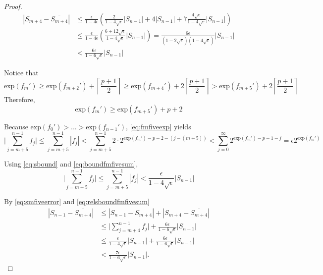\documentclass[12pt]{article}
\providecommand{\exp}{\ensuremath{\text{exp}}}
\theoremstyle{definition}
\numberwithin{equation}{section}
\numberwithin{figure}{section}
\begin{document}
\begin{proof}
      \begin{align}
      \left|S_{m+4} - \overline{S_{m+4}}\right|
          & \leq \frac{\epsilon}{1-4\epsilon}
              \left(
                  \frac{2}{1-4\sqrt{\epsilon}} |S_{n-1}|
                  + 4 |S_{n-1}|
                  + 7 \frac{4\sqrt{\epsilon}}{1-4\sqrt{\epsilon}} |S_{n-1}|
              \right) \nonumber \\
          & \leq \frac{\epsilon}{1-4\epsilon} \left(\frac{6+12\sqrt{\epsilon}}{1-4\sqrt{\epsilon}} |S_{n-1}|\right)
              = \frac{6\epsilon }{(1-2\sqrt{\epsilon})(1-4\sqrt{\epsilon})} |S_{n-1}| \nonumber \\
          & < \frac{6\epsilon}{1-6\sqrt{\epsilon}} |S_{n-1}|
          \label{eq:smfiveerror}
      \end{align}

      Notice that
      \begin{equation*}
        \exp(f_m') \geq \exp(f_{m + 2}') + \left\lceil\frac{p+ 1}{2}\right\rceil \geq \exp(f_{m + 4}') + 2  \left\lceil\frac{p + 1}{2}\right\rceil > \exp(f_{m + 5}')+ 2  \left\lceil\frac{p+ 1}{2}\right\rceil
      \end{equation*}
      Therefore,
      \begin{equation}
        \exp(f_m') \geq \exp(f_{m + 5}') + p + 2
        \label{eq:fmfiveexp}
      \end{equation}

      Because $\exp(f_0') > ... > \exp(f_{n - 1}')$, \eqref{eq:fmfiveexp} yields
      \begin{equation}
        \bigl|\sum\limits_{j = m + 5}^{n - 1} f_j\bigr| \leq \sum\limits_{j = m + 5}^{n - 1} |f_j| < \sum\limits_{j = m + 5}^{n - 1} 2 \cdot 2^{\exp(f_m') - p - 2 - (j - (m + 5))} < \sum\limits_{j = 0}^{\infty} 2^{\exp(f_m') - p - 1 - j} = \epsilon 2^{\exp(f_m')}
        \label{eq:boundfmfivesum}
      \end{equation}

      Using \eqref{eq:sbound} and \eqref{eq:boundfmfivesum},
      \begin{equation}
        \bigl|\sum\limits_{j = m + 5}^{n - 1} f_j\bigr| \leq \sum\limits_{j = m + 5}^{n - 1} |f_j| < \frac{\epsilon}{1 - 4  \sqrt\epsilon}|S_{n - 1}|
        \label{eq:relsboundfmfivesum}
      \end{equation}

      By \eqref{eq:smfiveerror} and \eqref{eq:relsboundfmfivesum}
      \begin{align}
        \left|S_{n-1} - \overline{S_{m+4}}\right|
        & \leq |S_{n-1} - S_{m+4}| + \left|S_{m+4} - \overline{S_{m+4}}\right| \nonumber \\
        & \leq \bigl|\sum_{j=m+4}^{n-1} f_j\bigr| + \frac{6\epsilon}{1-6\sqrt{\epsilon}} |S_{n-1}| \nonumber \\
        & \leq \frac{\epsilon}{1 - 4 \sqrt\epsilon}|S_{n-1}| + \frac{6\epsilon}{1-6\sqrt{\epsilon}} |S_{n-1}| \nonumber \\
        & <  \frac{7\epsilon}{1-6\sqrt{\epsilon}} |S_{n-1}|.
        \label{eq:smfiveerror-1}
      \end{align}


\end{proof}
\end{document}
